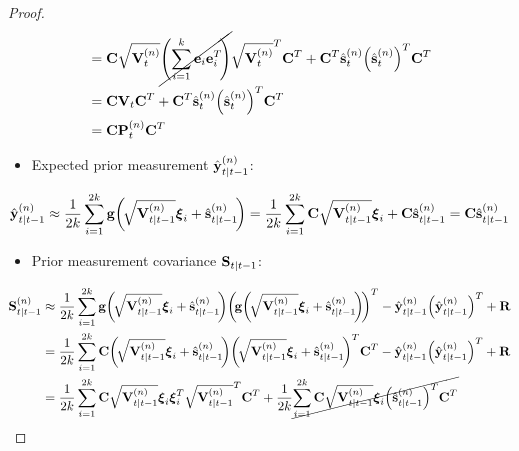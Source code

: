 \begin{proof}
\begin{align*}
					&= \boldsymbol{\mathrm{C}} \sqrt{\boldsymbol{\mathrm{V}}_t^{(n)}} \cancel{\Bigg(\! \sum_{i = 1}^{k} \boldsymbol{\mathrm{e}}_i \boldsymbol{\mathrm{e}}_i^T \!\Bigg)} \sqrt{\boldsymbol{\mathrm{V}}_t^{(n)}}^T \boldsymbol{\mathrm{C}}^T + \boldsymbol{\mathrm{C}}^T \hat{\boldsymbol{\mathrm{s}}}_t^{(n)} \Big(\hat{\boldsymbol{\mathrm{s}}}_t^{(n)}\Big)^T \boldsymbol{\mathrm{C}}^T \\
					&= \boldsymbol{\mathrm{C}} \boldsymbol{\mathrm{V}}_t \boldsymbol{\mathrm{C}}^T + \boldsymbol{\mathrm{C}}^T \hat{\boldsymbol{\mathrm{s}}}_t^{(n)} \Big(\hat{\boldsymbol{\mathrm{s}}}_t^{(n)}\Big)^T \boldsymbol{\mathrm{C}}^T \\
					&= \boldsymbol{\mathrm{C}} \boldsymbol{\mathrm{P}}_t^{(n)} \boldsymbol{\mathrm{C}}^T
			\end{align*}
			\begin{itemize}
				\item Expected prior measurement \( \hat{\boldsymbol{\mathrm{y}}}_{t \vert t - 1}^{(n)} \):
			\end{itemize}
			\begin{align*}
				\hat{\boldsymbol{\mathrm{y}}}_{t \vert t - 1}^{(n)}
					\approx \frac{1}{2k} \sum_{i = 1}^{2k} \boldsymbol{\mathrm{g}}\bigg(\! \sqrt{\boldsymbol{\mathrm{V}}_{t \vert t - 1}^{(n)}} \boldsymbol{\mathrm{\xi}}_i + \hat{\boldsymbol{\mathrm{s}}}_{t \vert t - 1}^{(n)} \!\bigg)
					= \frac{1}{2k} \sum_{i = 1}^{2k} \boldsymbol{\mathrm{C}} \sqrt{\boldsymbol{\mathrm{V}}_{t \vert t - 1}^{(n)}} \boldsymbol{\mathrm{\xi}}_i + \boldsymbol{\mathrm{C}} \hat{\boldsymbol{\mathrm{s}}}_{t \vert t - 1}^{(n)}
					= \boldsymbol{\mathrm{C}} \hat{\boldsymbol{\mathrm{s}}}_{t \vert t - 1}^{(n)}
			\end{align*}
			\begin{itemize}
				\item Prior measurement covariance \( \boldsymbol{\mathrm{S}}_{t \vert t - 1} \):
			\end{itemize}
			\begin{align*}
				\mat{S}_{t \subgiven t - 1}^{(n)}
					&\approx \frac{1}{2k} \sum_{i = 1}^{2k} \vec{g}\bigg(\!\sqrt{\mat{V}_{t \subgiven t - 1}^{(n)}} \vec{\xi}_i + \hat{\vec{s}}_{t \subgiven t - 1}^{(n)}\!\bigg) \bigg(\!\vec{g}\bigg(\!\sqrt{\mat{V}_{t \subgiven t - 1}^{(n)}} \vec{\xi}_i + \hat{\vec{s}}_{t \subgiven t - 1}^{(n)}\!\bigg)\!\bigg)^T - \hat{\vec{y}}_{t \subgiven t - 1}^{(n)} \Big( \hat{\vec{y}}_{t \subgiven t - 1}^{(n)} \Big)^T + \mat{R} \\
					&= \frac{1}{2k} \sum_{i = 1}^{2k} \mat{C} \bigg(\!\sqrt{\mat{V}_{t \subgiven t - 1}^{(n)}} \vec{\xi}_i + \hat{\vec{s}}_{t \subgiven t - 1}^{(n)}\!\bigg) \bigg(\!\sqrt{\mat{V}_{t \subgiven t - 1}^{(n)}} \vec{\xi}_i + \hat{\vec{s}}_{t \subgiven t - 1}^{(n)}\!\bigg)^T \mat{C}^T - \hat{\vec{y}}_{t \subgiven t - 1}^{(n)} \Big( \hat{\vec{y}}_{t \subgiven t - 1}^{(n)} \Big)^T + \mat{R} \\
					&= \frac{1}{2k} \sum_{i = 1}^{2k} \mat{C} \sqrt{\mat{V}_{t \subgiven t - 1}^{(n)}} \vec{\xi}_i \vec{\xi}_i^T \sqrt{\mat{V}_{t \subgiven t - 1}^{(n)}}^T \mat{C}^T + \frac{1}{2k} \cancel{\sum_{i = 1}^{2k} \mat{C} \sqrt{\mat{V}_{t \subgiven t - 1}^{(n)}} \vec{\xi}_i \Big(\hat{\vec{s}}_{t \subgiven t - 1}^{(n)}\Big)^T \mat{C}^T} \\

\end{align*}
\end{proof}
